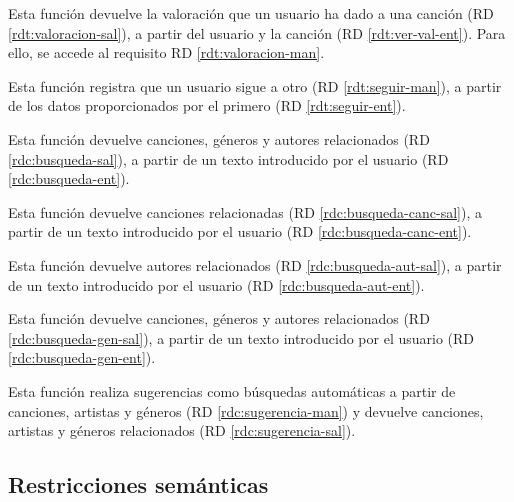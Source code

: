 Esta función devuelve la valoración que un usuario ha dado a una canción (RD \ref{rdt:valoracion-sal}), a partir del usuario y la canción (RD \ref{rdt:ver-val-ent}). Para ello, se accede al requisito RD \ref{rdt:valoracion-man}.

Esta función registra que un usuario sigue a otro (RD \ref{rdt:seguir-man}), a partir de los datos proporcionados por el primero (RD \ref{rdt:seguir-ent}).




Esta función devuelve canciones, géneros y autores relacionados (RD \ref{rdc:busqueda-sal}), a partir de un texto introducido por el usuario (RD \ref{rdc:busqueda-ent}).

Esta función devuelve canciones relacionadas (RD \ref{rdc:busqueda-canc-sal}), a partir de un texto introducido por el usuario (RD \ref{rdc:busqueda-canc-ent}).

Esta función devuelve autores relacionados (RD \ref{rdc:busqueda-aut-sal}), a partir de un texto introducido por el usuario (RD \ref{rdc:busqueda-aut-ent}).

Esta función devuelve canciones, géneros y autores relacionados (RD \ref{rdc:busqueda-gen-sal}), a partir de un texto introducido por el usuario (RD \ref{rdc:busqueda-gen-ent}).

Esta función realiza sugerencias como búsquedas automáticas a partir de canciones, artistas y géneros (RD \ref{rdc:sugerencia-man}) y devuelve canciones, artistas y géneros relacionados (RD \ref{rdc:sugerencia-sal}).

\subsection{Restricciones semánticas}


